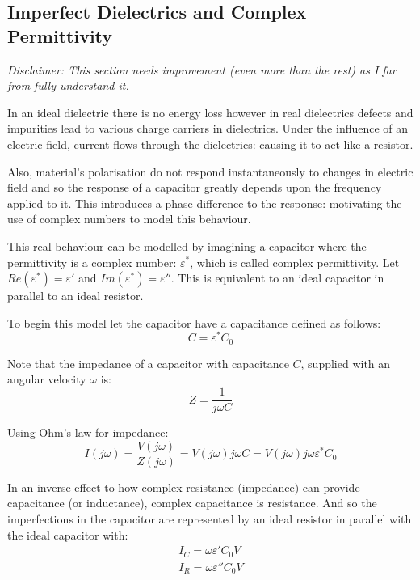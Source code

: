 \documentclass[11pt,a4paper]{report}
\begin{document}
\subsection{Imperfect Dielectrics and Complex Permittivity}
\textit{Disclaimer: This section needs improvement (even more than the rest) as I far from fully understand it.}


In an ideal dielectric there is no energy loss however in real dielectrics defects and impurities lead to various charge carriers in dielectrics. Under the influence of an electric field, current flows through the dielectrics: causing it to act like a resistor. 

Also, material's polarisation do not respond instantaneously to changes in electric field and so the response of a capacitor greatly depends upon the frequency applied to it. This introduces a phase difference to the response: motivating the use of complex numbers to model this behaviour.

This real behaviour can be modelled by imagining a capacitor where the permittivity is a complex number: $\varepsilon^*$, which is called complex permittivity. Let $Re(\varepsilon^*)=\varepsilon'$ and $Im(\varepsilon^*)=\varepsilon''$. This is equivalent to an ideal capacitor in parallel to an ideal resistor.

To begin this model let the capacitor have a capacitance defined as follows:
\begin{equation}
	\label{compPerm}
	C=\varepsilon^*C_0
\end{equation}

Note that the impedance of a capacitor with capacitance $C$, supplied with an angular velocity $\omega$ is:
\begin{equation*}
	Z=\frac{1}{j\omega C}
\end{equation*}

Using Ohm's law for impedance:
\begin{equation*}
	I(j\omega) = \frac{V(j\omega)}{Z(j\omega)} = V(j\omega)j\omega C = V(j\omega)j\omega\varepsilon^*C_0
\end{equation*}

In an inverse effect to how complex resistance (impedance) can provide capacitance (or inductance), complex capacitance is resistance. And so the imperfections in the capacitor are represented by an ideal resistor in parallel with the ideal capacitor with:
\begin{eqnarray*}
	I_C = \omega \varepsilon'C_0V \\
	I_R = \omega \varepsilon''C_0V
\end{eqnarray*} 
\end{document}
